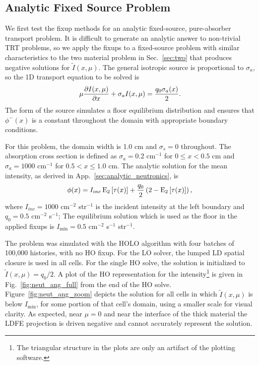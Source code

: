 \subsection{Analytic Fixed Source Problem}

We first test the fixup methods for an analytic fixed-source, pure-absorber transport problem.  It is
difficult to generate an analytic answer to non-trivial TRT problems, so we apply the
fixups to a
fixed-source problem with similar characteristics to the two material problem in
Sec.~\ref{sec:two} that produces negative solutions for $\tilde I(x,\mu)$.  The general
isotropic source is proportional to $\sigma_a$, so the 1D transport equation to be solved is 
\begin{equation}\label{apptr}
    \mu \frac{\partial I(x,\mu)}{\partial x} + \sigma_a I(x,\mu) = \frac{q_0\sigma_a(x)}{2}.
\end{equation}
The form of the source simulates a floor equilibrium distribution and ensures that $\phi^-(x)$ is a
constant throughout the domain with appropriate boundary conditions. 

For this problem, the domain width is 1.0 cm and $\sigma_s=0$ throughout.  The absorption
cross section is defined as $\sigma_a=0.2$ cm$^{-1}$ for $0\leq x <0.5$ cm and $\sigma_a=1000$ cm$^{-1}$ for
$0.5<x\leq1.0$ cm.  The analytic solution
for the mean intensity, as derived in App.~\ref{sec:analytic_neutronics}, is
\begin{equation}
    \phi(x) = I_{inc}\operatorname{E}_{2}\left[\tau(x)\right] + \frac{q_0}{2} \left(2 -
    \operatorname{E}_{2}\left[\tau(x)\right]\right),
\end{equation}
where $I_{inc}=1000$ cm$^{-2}$ str$^{-1}$ is the incident intensity at the left
boundary and $q_0 = 0.5$ cm$^{-2}$ s$^{-1}$; The equilibrium solution which is
used as the floor in the applied fixups is $I_{\min} = 0.5$ cm$^{-2}$ s$^{-1}$ str$^{-1}$.

The problem was simulated with the HOLO algorithm with four batches of 100,000 histories,
with no HO fixup.
For the LO solver, the lumped LD spatial closure is used in all cells.
For the single HO solve, the solution is initialized to $\tilde I(x,\mu)=q_0/2$.
A plot of the HO representation for the 
intensity\footnote{The triangular structure in the plots are only an artifact of the plotting
software.} is given in Fig.~\ref{fig:neut_ang_full} from the end of the HO solve.
Figure~\ref{fig:neut_ang_zoom} depicts the solution for all cells in which $\tilde
I(x,\mu)$ is
below $I_{\min}$, for some portion of that cell's domain, using a smaller scale for visual clarity.
As expected, near $\mu=0$ and near the interface of the thick material the LDFE projection
is driven negative and cannot accurately represent the solution.

